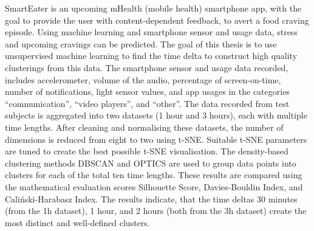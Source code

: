 
SmartEater is an upcoming mHealth (mobile health) smartphone app, with the goal to provide the user with content-dependent feedback, to avert a food craving episode. Using machine learning and  smartphone sensor and usage data, stress and upcoming cravings can be predicted. The goal of this thesis is to use unsupervised machine learning to find the time delta to construct high quality clusterings from this data. The smartphone sensor and usage data recorded, includes accelerometer, volume of the audio, percentage of screen-on-time, number of notifications, light sensor values, and app usages in the categories “communication”, “video players”, and “other”. The data recorded from test subjects is aggregated into two datasets (1 hour and 3 hours), each with multiple time lengths. After cleaning and normalising these datasets, the number of dimensions is reduced from eight to two using t-SNE. Suitable t-SNE parameters are tuned to create the best possible t-SNE visualisation. The density-based clustering methods DBSCAN and OPTICS are used to group data points into clusters for each of the total ten time lengths. These results are compared using the mathematical evaluation scores Silhouette Score, Davies-Bouldin Index, and Caliński-Harabasz Index. The results indicate, that the time deltas 30 minutes (from the 1h dataset), 1 hour, and 2 hours (both from the 3h dataset) create the most distinct and well-defined clusters.
